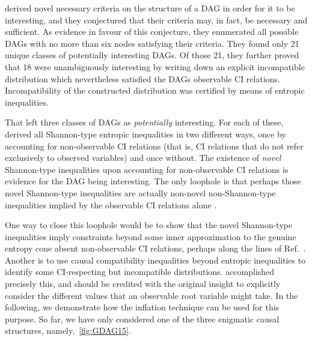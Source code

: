 \citet{pusey2014gdag} derived novel necessary criteria on the structure of a DAG in order for it to be interesting, and they conjectured that their criteria may, in fact, be necessary and sufficient. As evidence in favour of this conjecture, they enumerated all possible DAGs with no more than six nodes satisfying their criteria.
They found only 21 unique classes of potentially interesting DAGs.
Of those 21, they further proved that 18 were unambiguously interesting by writing down an explicit incompatible distribution which nevertheless satisfied the DAGs observable CI relations. Incompatibility of the constructed distribution was certified by means of entropic inequalities. 

That left three classes of DAGs  as \emph{potentially} interesting. For each of these, \citet{pusey2014gdag} derived all Shannon-type entropic inequalities in two different ways, once by accounting for non-observable CI relations (that is, CI relations that do not refer exclusively to observed variables) and once without. The existence of \emph{novel} Shannon-type inequalities upon accounting for non-observable CI relations is evidence for the DAG being interesting. The only loophole is that perhaps those novel Shannon-type inequalities are actually non-novel non-Shannon-type inequalities implied by the observable CI relations alone \cite{pusey2014gdag}. %

One way to close this loophole would be to show that the novel Shannon-type inequalities imply constraints beyond some inner approximation to the genuine entropy cone absent non-observable CI relations, perhaps along the lines of Ref.~\cite{weilenmann2016entropic}. Another is to use causal compatibility inequalities beyond entropic inequalities to identify some CI-respecting but incompatible distributions. \citet{pianaar2016interesting} accomplished precisely this, and should be credited with the original insight to explicitly consider the different values that an observable root variable might take. In the following, we demonstrate how the inflation technique can be used for this purpose. So far, we have only considered one of the three enigmatic causal structures, namely,~\cref{fig:GDAG15}.

